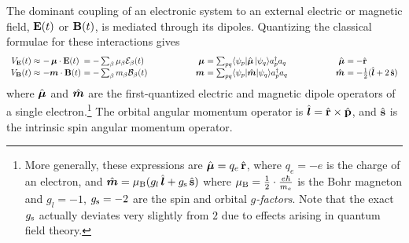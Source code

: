 \documentclass[11pt]{article}
\numberwithin{equation}{section}
\begin{document}
\begin{ex}
The dominant coupling of an electronic system to an external electric or magnetic field, $\mathbf{E}(t)$ or $\mathbf{B}(t)$, is mediated through its dipoles.
Quantizing the classical formulae for these interactions gives
\begin{align}
\begin{array}{r@{\ }l@{\ }l@{\hspace{2cm}}r@{\ }l@{\hspace{2cm}}r@{\ }l}
  V_{\bo{E}}(t)
\approx&
-\,
  \bm{\mu}\cdot\bo{E}(t)
&=
-
  \sum_\b
  \mu_\b
  \mc{E}_\b(t)
&
  \bm{\mu}
&=
  \sum_{pq}
  \ip{\y_p|\op{\bm{\mu}}\,|\y_q}
  a_p\dg a_q
&
  \op{\bm{\mu}}
&=
-
  \op{\bo{r}}
\\
  V_{\bo{B}}(t)
\approx&
-
  \bm{m}\cdot\bo{B}(t)
&=
-
  \sum_\b
  m_\b
  \mc{B}_\b(t)
&
  \bm{m}
&=
  \sum_{pq}
  \ip{\y_p|\op{\bm{m}}|\y_q}
  a_p\dg a_q
&
  \op{\bm{m}}
&=
-
  \tfr{1}{2}
  (
    \op{\bm{l}}
  +
    2\,
    \op{\bo{s}}
  )
\end{array}
\end{align}
where $\op{\bm{\mu}}$ and $\op{\bm{m}}$ are the first-quantized electric and magnetic dipole operators of a single electron.\footnote{
More generally, these expressions are
$
  \op{\bm{\mu}}
=
  q_e\,\op{\bo{r}}
$,
where $q_e=-e$ is the charge of an electron,
and
$
  \op{\bm{m}}
=
  \mu_\mr{B}
  (
    g_l\,
    \op{\bm{l}}
  +
    g_{\mr{s}}\,
    \op{\bo{s}}
  )
$
where $\mu_{\mr{B}}=\tfr{1}{2}\cdot\tfr{e\hbar}{m_e}$ is the Bohr magneton and $g_l=-1$, $g_{\mathrm{s}}=-2$ are the spin and orbital \textit{$g$-factors}.
Note that the exact $g_{\mathrm{s}}$ actually deviates very slightly from $2$ due to effects arising in quantum field theory.
}
The orbital angular momentum operator is $\op{\bm{l}}=\op{\bo{r}}\times\op{\bo{p}}$, and $\hat{\mathbf{s}}$ is the intrinsic spin angular momentum operator.

\end{ex}
\end{document}
